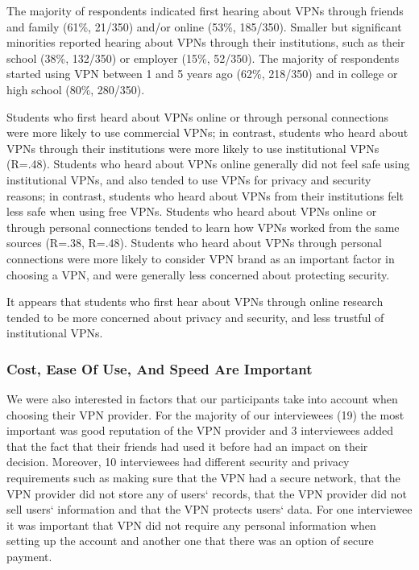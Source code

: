The majority of respondents indicated first hearing about VPNs through friends
and family (61\%, 21/350) and/or online (53\%, 185/350). Smaller but
significant minorities reported hearing about VPNs through their institutions,
such as their school (38\%, 132/350) or employer (15\%, 52/350). The majority
of respondents started using VPN between 1 and 5 years ago (62\%, 218/350) and
in college or high school (80\%, 280/350).

Students who first heard about VPNs online or through personal connections
were more likely to use commercial VPNs; in contrast, students who heard about
VPNs through their institutions were more likely to use institutional VPNs
(R=.48). Students who heard about VPNs online generally did not feel safe
using institutional VPNs, and also tended to use VPNs for privacy and security
reasons; in contrast, students who heard about VPNs from their institutions
felt less safe when using free VPNs. Students who heard about VPNs online or
through personal connections tended to learn how VPNs worked from the same
sources (R=.38, R=.48). Students who heard about VPNs through personal
connections were more likely to consider VPN brand as an important factor in
choosing a VPN, and were generally less concerned about protecting security. 

It appears that students who first hear about VPNs through online research
tended to be more concerned about privacy and security, and less trustful of
institutional VPNs. 

\subsubsection{Cost, Ease Of Use, And Speed Are Important} We were also interested in factors that
our participants take into account when choosing their VPN provider. For the majority of our interviewees (19) the most
important was good reputation of the VPN provider and 3 interviewees added
that the fact that their friends had used it before had an impact on their
decision.  Moreover, 10 interviewees had different
security and privacy requirements such as making sure that the VPN had a secure network,
that the VPN provider did not store any of users‘ records, that the VPN provider did
not sell users‘ information and that the VPN protects users‘ data. For one
interviewee it was important that VPN did not require any personal information
when setting up the account and another one that there was an option of secure
payment. 

